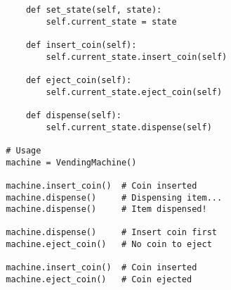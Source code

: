 \begin{example}
\begin{lstlisting}
            def set_state(self, state):
                self.current_state = state
            
            def insert_coin(self):
                self.current_state.insert_coin(self)
            
            def eject_coin(self):
                self.current_state.eject_coin(self)
            
            def dispense(self):
                self.current_state.dispense(self)

        # Usage
        machine = VendingMachine()

        machine.insert_coin()  # Coin inserted
        machine.dispense()     # Dispensing item...
        machine.dispense()     # Item dispensed!

        machine.dispense()     # Insert coin first
        machine.eject_coin()   # No coin to eject

        machine.insert_coin()  # Coin inserted
        machine.eject_coin()   # Coin ejected 
      \end{lstlisting}
    \end{example}
